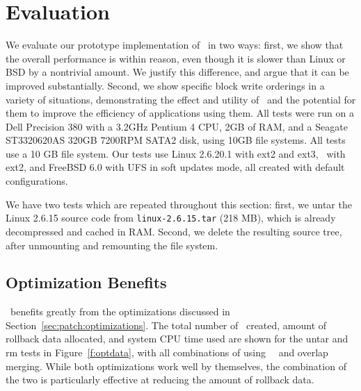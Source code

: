 \section {Evaluation}
\label{sec:evaluation}

We evaluate our prototype implementation of \Kudos\ in two ways: first, we
show that the overall performance is within reason, even though it is slower
than Linux or BSD by a nontrivial amount. We justify this difference, and argue
that it can be improved substantially. Second, we show specific block write
orderings in a variety of situations, demonstrating the effect and utility of
\opgroups\ and the potential for them to improve the efficiency of applications
using them. All tests were run on a Dell Precision 380 with a 3.2GHz Pentium 4
CPU, 2GB of RAM, and a Seagate ST3320620AS 320GB 7200RPM SATA2 disk, using 10GB
file systems.
%
All tests use a 10 GB file system.
%
Our tests use Linux 2.6.20.1 with ext2 and ext3, \Kudos\ with ext2, and
FreeBSD 6.0 with UFS in soft updates mode, all created with default
configurations.

We have two tests which are repeated throughout this section: first, we untar
the Linux 2.6.15 source code from \texttt{linux-2.6.15.tar} (218 MB), which is
already decompressed and cached in RAM. Second, we delete the resulting source
tree, after unmounting and remounting the file system.

\subsection {Optimization Benefits}

\Kudos\ benefits greatly from the optimizations discussed in
Section~\ref{sec:patch:optimizations}. The total number of \chdescs\ created,
amount of rollback data allocated, and system CPU time used are shown for the
untar and rm tests in Figure~\ref{f:optdata}, with all combinations of using
\nrb\ \chdescs\ and overlap merging. While both optimizations work well by
themselves, the combination of the two is particularly effective at reducing the
amount of rollback data.

